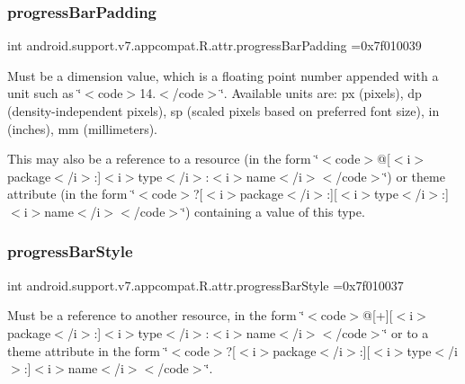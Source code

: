 \subsubsection{\texorpdfstring{progress\+Bar\+Padding}{progressBarPadding}}
{\footnotesize\ttfamily int android.\+support.\+v7.\+appcompat.\+R.\+attr.\+progress\+Bar\+Padding =0x7f010039\hspace{0.3cm}{\ttfamily [static]}}

Must be a dimension value, which is a floating point number appended with a unit such as \char`\"{}$<$code$>$14.\+5sp$<$/code$>$\char`\"{}. Available units are\+: px (pixels), dp (density-\/independent pixels), sp (scaled pixels based on preferred font size), in (inches), mm (millimeters). 

This may also be a reference to a resource (in the form \char`\"{}$<$code$>$@\mbox{[}$<$i$>$package$<$/i$>$\+:\mbox{]}$<$i$>$type$<$/i$>$\+:$<$i$>$name$<$/i$>$$<$/code$>$\char`\"{}) or theme attribute (in the form \char`\"{}$<$code$>$?\mbox{[}$<$i$>$package$<$/i$>$\+:\mbox{]}\mbox{[}$<$i$>$type$<$/i$>$\+:\mbox{]}$<$i$>$name$<$/i$>$$<$/code$>$\char`\"{}) containing a value of this type. \mbox{\label{classandroid_1_1support_1_1v7_1_1appcompat_1_1R_1_1attr_abd2e9f1977b38a07341c90beac08fe98}} 
\subsubsection{\texorpdfstring{progress\+Bar\+Style}{progressBarStyle}}
{\footnotesize\ttfamily int android.\+support.\+v7.\+appcompat.\+R.\+attr.\+progress\+Bar\+Style =0x7f010037\hspace{0.3cm}{\ttfamily [static]}}

Must be a reference to another resource, in the form \char`\"{}$<$code$>$@\mbox{[}+\mbox{]}\mbox{[}$<$i$>$package$<$/i$>$\+:\mbox{]}$<$i$>$type$<$/i$>$\+:$<$i$>$name$<$/i$>$$<$/code$>$\char`\"{} or to a theme attribute in the form \char`\"{}$<$code$>$?\mbox{[}$<$i$>$package$<$/i$>$\+:\mbox{]}\mbox{[}$<$i$>$type$<$/i$>$\+:\mbox{]}$<$i$>$name$<$/i$>$$<$/code$>$\char`\"{}. \mbox{\label{classandroid_1_1support_1_1v7_1_1appcompat_1_1R_1_1attr_a99efbff6d3c68cf5516d7ec329aaf55b}} 
